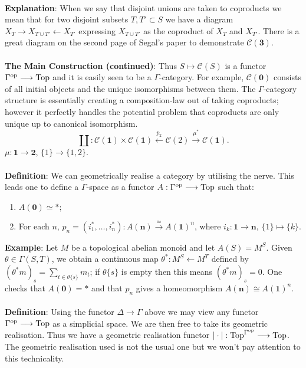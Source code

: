 \documentclass[11pt]{article}
\begin{document}
\begin{Jandr GammaCat notes}
\\
\textbf{Explanation}: When we say that disjoint unions are taken to coproducts we mean that for two disjoint subsets $T,T'\subset S$ we have a diagram $X_T\to X_{T\cup T'}\longleftarrow X_{T'}$ expressing $X_{T\cup T'}$ as the coproduct of $X_T$ and $X_{T'}$. There is a great diagram on the second page of Segal's paper to demonstrate $\mathscr{C}(\textbf{3})$.\\
\\
\textbf{The Main Construction (continued)}: Thus $S\mapsto\mathscr{C}(S)$ is a functor $\Gamma^{\textup{op}}\to\textup{Top}$ and it is easily seen to be a $\Gamma$-category. For example, $\mathscr{C}(\textbf{0})$ consists of all initial objects and the unique isomorphisms between them. The $\Gamma$-category structure is essentially creating a composition-law out of taking coproducts; however it perfectly handles the potential problem that coproducts are only unique up to canonical isomorphism.
\[\coprod:\mathscr{C}(\textbf{1})\times\mathscr{C}(\textbf{1})\overset{p_2}{\longleftarrow}\mathscr{C}(2)\overset{\mu^*}{\to}\mathscr{C}(\textbf{1}).\]
$\mu:\textbf{1}\to\textbf{2}$, $\{1\}\to\{1,2\}$.\\
\\
\textbf{Definition}: We can geometrically realise a category by utilising the nerve. This leads one to define a $\Gamma$-space as a functor 
$A:\Gamma^{\textup{op}}\to\textup{Top}$ such that:
\begin{enumerate}
\item $A(\textbf{0})\simeq *;$
\item For each $n$, $p_n=(i_1^*,\ldots,i_n^*):
A(\textbf{n})\overset{\simeq}{\to} A(\textbf{1})^n$, where $i_k:\textbf{1}\to\textbf{n}$, $\{1\}\mapsto \{k\}$.
\end{enumerate}
\phantom{poo}
\textbf{Example}: Let $M$ be a topological abelian monoid and let $A(S)=M^S$. Given $\theta\in\Gamma(S,T)$, we obtain a continuous map $\theta^*:M^S\longleftarrow M^T$ defined by $(\theta^*m)_s=\sum_{t\in\theta\{s\}}m_t$; if $\theta\{s\}$ is empty then this means $(\theta^*m)_s=0$. One checks that $A(\textbf{0})=*$ and that $p_n$ gives a homeomorphism $A(\textbf{n})\cong A(\textbf{1})^n$.\\
\\
\textbf{Definition}: Using the functor $\Delta\to\Gamma$ above we may view any functor $\Gamma^{\textup{op}}\to\textup{Top}$ as a simplicial space. We are then free to take its geometric realisation. Thus we have a geometric realisation functor $|\cdot|:\textup{Top}^{\Gamma^\textup{op}}\to\textup{Top}$. The geometric realisation used is not the usual one but we won't pay attention to this technicality.\\

\end{Jandr GammaCat notes}
\end{document}
